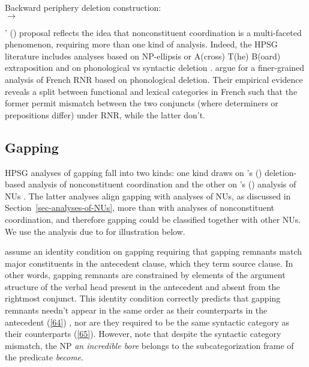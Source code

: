 \documentclass[output=paper
                ,modfonts
                ,nonflat
	        ,collection
	        ,collectionchapter
	        ,collectiontoclongg
 	        ,biblatex
                ,babelshorthands
                ,newtxmath
                ,draftmode
                ,colorlinks, citecolor=brown
]{./langsci/langscibook}
\begin{document}
{%
{}

\ea
\label{63}
Backward periphery deletion construction:\\
 $\to$
\z



\citeauthor{Chaves2014}' (\citeyear{Chaves2014}) proposal reflects the idea that nonconstituent coordination is a multi-faceted phenomenon, requiring more than one kind of analysis. Indeed, the HPSG literature includes analyses based on NP-ellipsis or A(cross) T(he) B(oard) extraposition \citep{Chaves2014} and on phonological vs syntactic deletion \citep{Yatabe2001, Yatabe2012, Yatabe2019}. \citet{Abeille2016} argue for a finer-grained analysis of French RNR based on phonological deletion. Their empirical evidence reveals a split between functional and lexical categories in French such that the former permit mismatch between the two conjuncts (where determiners or prepositions differ) under RNR, while the latter don't.



\subsection{Gapping}
HPSG analyses of gapping fall into two kinds: one kind draws on \citeauthor{Beavers2004}'s (\citeyear{Beavers2004}) deletion-based analysis of nonconstituent coordination \citep{Chaves2009} and the other on \citeauthor{Ginzburg:Sag:2000}'s (\citeyear{Ginzburg:Sag:2000}) analysis of NUs \citep{Abeille2014, Park2018}. The latter analyses align gapping with analyses of NUs, as discussed in Section~\ref{sec-analyses-of-NUs}, more than with analyses of nonconstituent coordination, and therefore gapping could be classified together with other NUs. We use the analysis due to \citet{Abeille2014} for illustration below.

\citet{Abeille2014} assume an identity condition on gapping requiring that gapping remnants match major constituents in the antecedent clause, which they term source clause. In other words, gapping remnants are constrained by elements of the argument structure of the verbal head present in the antecedent and absent from the rightmost conjunct. %
This identity condition correctly predicts that gapping remnants needn't appear in the same order as their counterparts in the antecedent (\ref{64}) \citep[see][156--158]{Sag1985}, nor are they required to be the same syntactic category as their counterparts (\ref{65}). However, note that despite the syntactic category mismatch, the NP \emph{an incredible bore} belongs to the subcategorization frame of the predicate \emph{become}.

}
\end{document}
